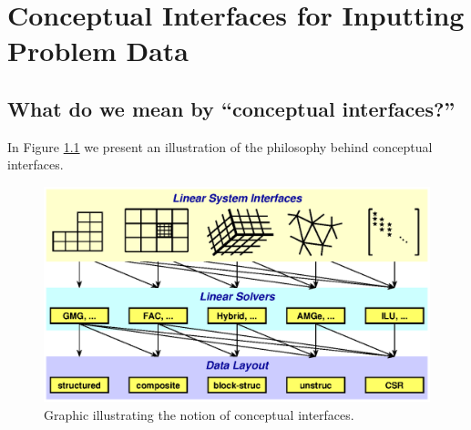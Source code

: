 \chapter{Conceptual Interfaces for Inputting Problem Data}
\label{Conceptual Interfaces}

\section{What do we mean by ``conceptual interfaces?''}

In Figure \ref{fig-conceptual-interface} we present an illustration
of the philosophy behind conceptual interfaces.


\begin{figure}
\centering
\includegraphics[width=5in]{concep_iface.eps}
\caption{%
Graphic illustrating the notion of conceptual interfaces.}
\label{fig-conceptual-interface}
\end{figure}


